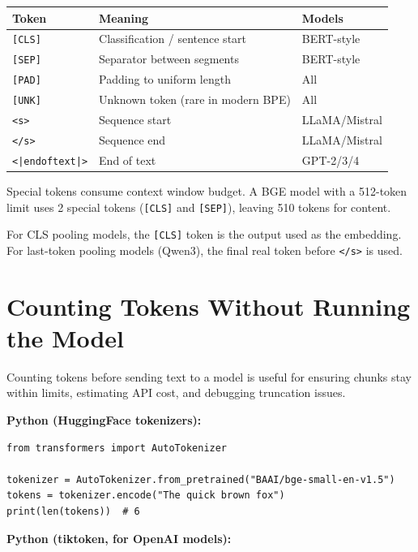 \begin{center}
\begin{tabular}{lll}
\toprule
\textbf{Token} & \textbf{Meaning} & \textbf{Models} \\
\midrule
\texttt{[CLS]} & Classification / sentence start & BERT-style \\
\texttt{[SEP]} & Separator between segments & BERT-style \\
\texttt{[PAD]} & Padding to uniform length & All \\
\texttt{[UNK]} & Unknown token (rare in modern BPE) & All \\
\texttt{<s>} & Sequence start & LLaMA/Mistral \\
\texttt{</s>} & Sequence end & LLaMA/Mistral \\
\texttt{<|endoftext|>} & End of text & GPT-2/3/4 \\
\bottomrule
\end{tabular}
\end{center}

Special tokens consume context window budget. A BGE model with a 512-token limit uses 2
special tokens (\texttt{[CLS]} and \texttt{[SEP]}), leaving 510 tokens for content.

For CLS pooling models, the \texttt{[CLS]} token is the output used as the embedding.
For last-token pooling models (Qwen3), the final real token before \texttt{</s>} is used.

\section{Counting Tokens Without Running the Model}

Counting tokens before sending text to a model is useful for ensuring chunks stay within
limits, estimating API cost, and debugging truncation issues.

\textbf{Python (HuggingFace tokenizers):}

\begin{Verbatim}
from transformers import AutoTokenizer

tokenizer = AutoTokenizer.from_pretrained("BAAI/bge-small-en-v1.5")
tokens = tokenizer.encode("The quick brown fox")
print(len(tokens))  # 6
\end{Verbatim}

\textbf{Python (tiktoken, for OpenAI models):}

